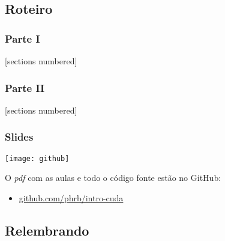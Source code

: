 \documentclass[10pt, compress]{beamer}
\begin{document}
\subsection{Roteiro}

\begin{frame}
    \frametitle{Parte I}
    [sections numbered]
    \tableofcontents[hideallsubsections, part=1]
\end{frame}

\begin{frame}
    \frametitle{Parte II}
    [sections numbered]
    \tableofcontents[hideallsubsections, part=2]
\end{frame}

\begin{frame}
    \frametitle{Slides}
    \begin{center}
        \texttt{[image: github]}
    \end{center}
    O \emph{pdf} com as aulas e todo o código fonte estão no \alert{GitHub}:

    \begin{itemize}
        \item \url{github.com/phrb/intro-cuda}
    \end{itemize}
\end{frame}

\subsection{Relembrando}
\end{document}
